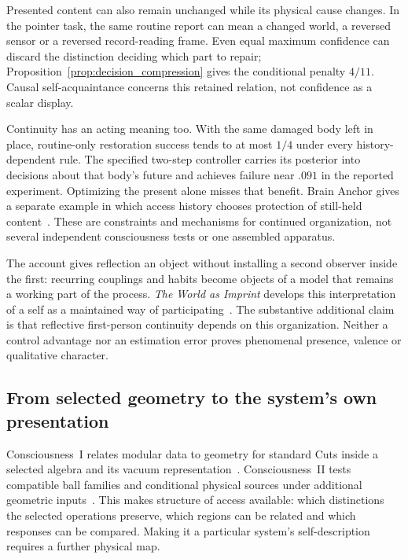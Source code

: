 \documentclass[12pt]{article}
\theoremstyle{definition}
\theoremstyle{remark}
\begin{document}
Presented content can also remain unchanged while its physical cause
changes. In the pointer task, the same routine report can mean a
changed world, a reversed sensor or a reversed record-reading frame.
Even equal maximum confidence can discard the distinction deciding
which part to repair; Proposition~\ref{prop:decision_compression}
gives the conditional penalty $4/11$.
Causal self-acquaintance concerns this retained relation, not
confidence as a scalar display.

Continuity has an acting meaning too. With the same damaged body
left in place, routine-only restoration success tends to at most
$1/4$ under every history-dependent rule. The specified two-step
controller carries its posterior into decisions about that body's
future and achieves failure near $.091$ in the reported experiment.
Optimizing the present alone misses that benefit.
Brain Anchor gives a separate example in which access history chooses
protection of still-held content~\cite{BrainAnchor}.
These are constraints and mechanisms for continued organization, not
several independent consciousness tests or one assembled apparatus.

The account gives reflection an object without installing a second
observer inside the first: recurring couplings and habits become
objects of a model that remains a working part of the process.
\emph{The World as Imprint} develops this interpretation of a self
as a maintained way of participating~\cite{WorldImprint}.
The substantive additional claim is that reflective first-person
continuity depends on this organization.
Neither a control advantage nor an estimation error proves phenomenal
presence, valence or qualitative character.

\subsection{From selected geometry to the system's own presentation}

Consciousness~I relates modular data to geometry for standard Cuts
inside a selected algebra and its vacuum representation~\cite{PaperI}.
Consciousness~II tests compatible ball families and conditional
physical sources under additional geometric inputs~\cite{PaperII}.
This makes structure of access available: which distinctions the
selected operations preserve, which regions can be related and
which responses can be compared. Making it a particular system's
self-description requires a further physical map.
\end{document}
